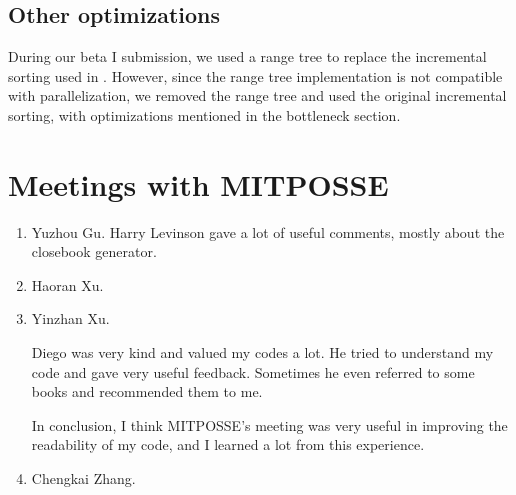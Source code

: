 \documentclass[10pt,twosidep]{article}
\begin{document}
\subsection{Other optimizations}
During our beta I submission, we used a range tree to replace the incremental sorting used in \scs. However, since the range tree implementation is not compatible with parallelization, we removed the range tree and used the original incremental sorting, with optimizations mentioned in the bottleneck section.

\section{Meetings with MITPOSSE}
\begin{enumerate}
	\item Yuzhou Gu.
	Harry Levinson gave a lot of useful comments, mostly about the closebook generator.
	\item Haoran Xu.
	\item Yinzhan Xu.
	
	Diego was very kind and valued my codes a lot. He tried to understand my code and gave very useful feedback. Sometimes he even referred to some books and recommended them to me. 
	
	In conclusion, I think MITPOSSE's meeting was very useful in improving the readability of my code, and I learned a lot from this experience.
	\item Chengkai Zhang.
\end{enumerate}
\end{document}

